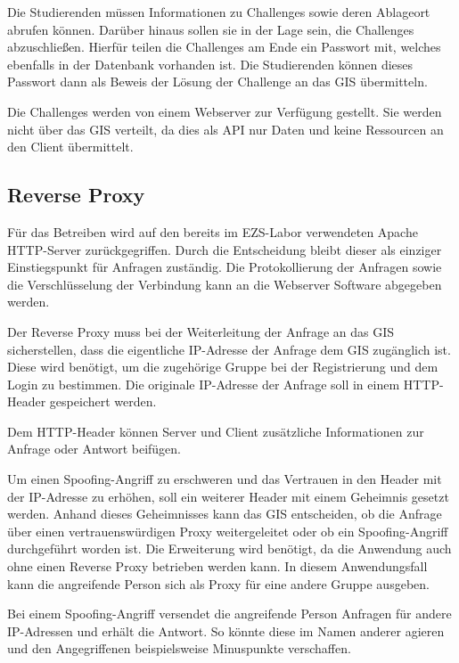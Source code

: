 Die Studierenden müssen Informationen zu Challenges sowie deren Ablageort abrufen können. Darüber hinaus sollen sie in der Lage sein, die Challenges abzuschließen. Hierfür teilen die Challenges am Ende ein Passwort mit, welches ebenfalls in der Datenbank vorhanden ist. Die Studierenden können dieses Passwort dann als Beweis der Lösung der Challenge an das GIS übermitteln.

Die Challenges werden von einem Webserver zur Verfügung gestellt. Sie werden nicht über das GIS verteilt, da dies als API nur Daten und keine Ressourcen an den Client übermittelt.

\subsection{Reverse Proxy}
Für das Betreiben wird auf den bereits im EZS-Labor verwendeten Apache HTTP-Server zurückgegriffen. Durch die Entscheidung bleibt dieser als einziger Einstiegspunkt für Anfragen zuständig. Die Protokollierung der Anfragen sowie die Verschlüsselung der Verbindung kann an die Webserver Software abgegeben werden.

Der Reverse Proxy muss bei der Weiterleitung der Anfrage an das GIS sicherstellen, dass die eigentliche IP-Adresse der Anfrage dem GIS zugänglich ist. Diese wird benötigt, um die zugehörige Gruppe bei der Registrierung und dem Login zu bestimmen. Die originale IP-Adresse der Anfrage soll in einem HTTP-Header gespeichert werden.

Dem HTTP-Header können Server und Client zusätzliche Informationen zur Anfrage oder Antwort beifügen. \cite{mdncontributorsHTTPHeaders2020}

Um einen Spoofing-Angriff zu erschweren und das Vertrauen in den Header mit der IP-Adresse zu erhöhen, soll ein weiterer Header mit einem Geheimnis gesetzt werden. Anhand dieses Geheimnisses kann das GIS entscheiden, ob die Anfrage über einen vertrauenswürdigen Proxy weitergeleitet oder ob ein Spoofing-Angriff durchgeführt worden ist. Die Erweiterung wird benötigt, da die Anwendung auch ohne einen Reverse Proxy betrieben werden kann. In diesem Anwendungsfall kann die angreifende Person sich als Proxy für eine andere Gruppe ausgeben.

Bei einem Spoofing-Angriff versendet die angreifende Person Anfragen für andere IP-Adressen und erhält die Antwort. So könnte diese im Namen anderer agieren und den Angegriffenen beispielsweise Minuspunkte verschaffen.
